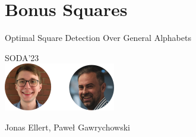 \section{Bonus Squares}

\begin{frame}
    \centering
    {\Large Optimal Square Detection  Over General Alphabets}
  
    \bigskip
    {\large SODA'23}\\
    \bigskip
    \includegraphics{pictures/mindmap/squares.png}
  
    \bigskip
    Jonas Ellert, Paweł Gawrychowski
\end{frame}

